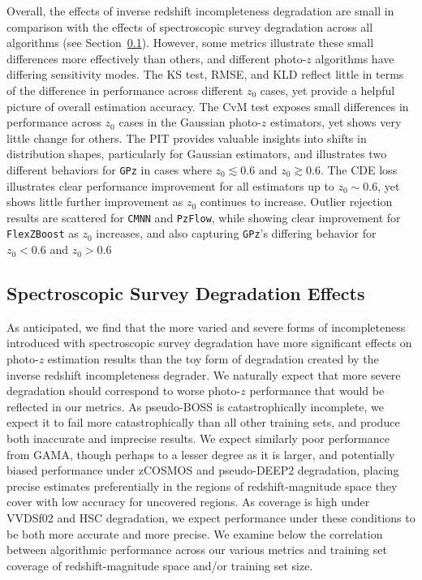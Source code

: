 \documentclass[fleqn,usenatbib,useAMS]{mnras}
\newcommand{\PersonalTag}[3]{{\color{#2}{$^{#1}$ [#3}]}}
\newcommand{\aim}[1]{\PersonalTag{Alex}{violet}{#1}}
\newcommand{\rachel}[1]{\PersonalTag{Rachel}{orange}{#1}}
\begin{document}
Overall, the effects of inverse redshift incompleteness degradation are small in comparison with the effects of spectroscopic survey degradation across all algorithms (see Section~\ref{sec:spec}). 
However, some metrics illustrate these small differences more effectively than others, and different photo-$z$ algorithms have differing sensitivity modes. The KS test, RMSE, and KLD reflect little in terms of the difference in performance across different $z_0$ cases, yet provide a helpful picture of overall estimation accuracy. The CvM test exposes small differences in performance across $z_0$ cases in the Gaussian photo-$z$ estimators, yet shows very little change for others. The PIT provides valuable insights into shifts in distribution shapes, particularly for Gaussian estimators, and illustrates two different behaviors for \texttt{GPz} in cases where $z_0 \lesssim 0.6$ and $z_0 \gtrsim 0.6$. The CDE loss illustrates clear performance improvement for all estimators up to $z_0 \sim 0.6$, yet shows little further improvement as $z_0$ continues to increase. Outlier rejection results are scattered for \texttt{CMNN} and \texttt{PzFlow}, while showing clear improvement for \texttt{FlexZBoost} as $z_0$ increases, and also capturing \texttt{GPz}'s differing behavior for $z_0 < 0.6$ and $z_0 > 0.6$ 





\subsection{Spectroscopic Survey Degradation Effects}
\label{sec:spec}

As anticipated, we find that the more varied and severe forms of incompleteness introduced with spectroscopic survey degradation have more significant effects on photo-$z$ estimation results than the toy form of degradation created by the inverse redshift incompleteness degrader.  
%
We naturally expect that more severe degradation should correspond to worse photo-$z$ performance that would be reflected in our metrics. As pseudo-BOSS is catastrophically incomplete, we expect it to fail more catastrophically than all other training sets, and produce both inaccurate and imprecise results. We  expect similarly poor performance from GAMA, though perhaps to a lesser degree as it is larger, and potentially biased performance under zCOSMOS and pseudo-DEEP2 degradation, placing precise estimates preferentially in the regions of redshift-magnitude space they cover with low accuracy for uncovered regions. 
As coverage is high under VVDSf02 and HSC degradation, we expect performance under these conditions to be both more accurate and more precise. 
We examine below the correlation between algorithmic performance across our various metrics and training set coverage of redshift-magnitude space and/or training set size.
\end{document}
